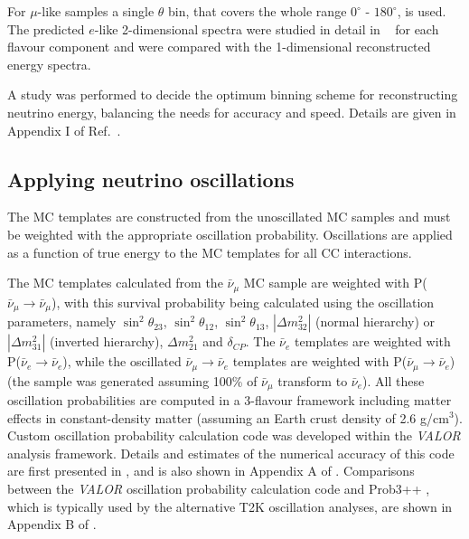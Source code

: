 For $\mu$-like samples a single $\theta$ bin, that covers the whole range $0^{\circ}$ - $180^{\circ}$, is used. The predicted $e$-like 2-dimensional spectra were studied in detail in ~\cite{OurRun1617b17cJointAnalysis3Flavour} for each flavour component and were compared with the 1-dimensional reconstructed energy spectra.

A study was performed to decide the optimum binning scheme for reconstructing neutrino energy, balancing the needs for accuracy and speed. Details are given in Appendix I of Ref.\ \cite{OurRun123DisappAnalysis3Flavour}.

\subsection{Applying neutrino oscillations}
\label{app:details:applying_oscillations}

The MC templates are constructed from the unoscillated MC samples and must be weighted with the appropriate oscillation probability. Oscillations are applied as a function of true energy to the MC templates for all CC interactions.

The MC templates calculated from the $\bar{\nu}_{\mu}$ MC sample are weighted with P($\bar{\nu}_{\mu} \rightarrow \bar{\nu}_{\mu}$), with this survival probability being calculated using the oscillation parameters, namely $\sin^{2} \theta_{23}$, $\sin^{2} \theta_{12}$, $\sin^{2} \theta_{13}$, $|\Delta m^{2}_{32}|$ (normal hierarchy) or $|\Delta m^{2}_{31}|$ (inverted hierarchy), $\Delta m^{2}_{21}$ and $\delta_{CP}$. The $\bar{\nu}_{e}$ templates are weighted with P($\bar{\nu}_{e} \rightarrow \bar{\nu}_{e}$), while the oscillated $\bar{\nu}_{\mu} \rightarrow \bar{\nu}_{e}$ templates are weighted with P($\bar{\nu}_{\mu} \rightarrow \bar{\nu}_{e}$) (the sample was generated assuming 100\% of $\bar{\nu}_{\mu}$ transform to $\bar{\nu}_{e}$). All these oscillation probabilities are computed in a 3-flavour framework including matter effects in constant-density matter (assuming an Earth crust density of 2.6 g/cm$^{3}$). Custom oscillation probability calculation code was developed within the {\em VALOR} analysis framework. Details and estimates of the numerical accuracy of this code are first presented in \cite{OurRun12DisappAnalysis3Flavour}, and is also shown in Appendix A of \cite{OurRun123DisappAnalysis3Flavour}.
Comparisons between the {\em VALOR} oscillation probability calculation code and Prob3++ \cite{Prob3}, which is typically used by the alternative T2K oscillation analyses, are shown in Appendix B of \cite{OurRun123DisappAnalysis3Flavour}.

